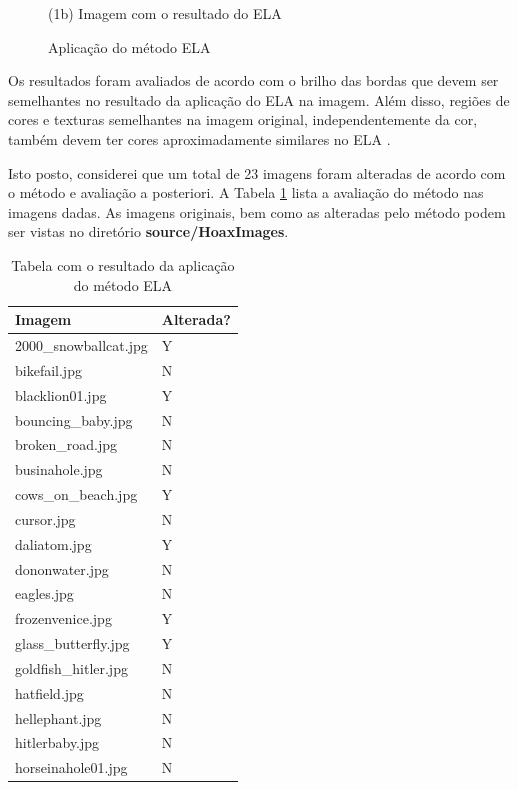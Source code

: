 \documentclass[12pt]{article}
\begin{document}
\begin{itemize}
\begin{itemize}
\begin{figure}[H]
\begin{minipage}[b]{0.45\textwidth}
	\centerline{\small (1b) Imagem com o resultado do ELA}
\end{minipage}
\caption{Aplicação do método ELA}
\label{fig1}
\end{figure}

Os resultados foram avaliados de acordo com o brilho das bordas que devem ser semelhantes no resultado 
da aplicação do ELA na imagem. Além disso, regiões de cores e texturas semelhantes na imagem
original, independentemente da cor, também devem ter cores aproximadamente similares no ELA \cite{berkeleywebsite}.

Isto posto, considerei que um total de 23 imagens foram alteradas de acordo com o método e avaliação a posteriori. 
A Tabela \ref{table-hoax-imgs} lista a avaliação do método nas imagens dadas. As imagens originais, bem como as
alteradas pelo método podem ser vistas no diretório \textbf{source/HoaxImages}.
\begin{table}[]
\centering
\caption{Tabela com o resultado da aplicação do método ELA}
\label{table-hoax-imgs}
\begin{tabular}{|l|l|} \hline
Imagem                 & Alterada? \\ \hline
2000\_snowballcat.jpg  & Y         \\
bikefail.jpg           & N         \\
blacklion01.jpg        & Y         \\
bouncing\_baby.jpg     & N         \\
broken\_road.jpg       & N         \\
businahole.jpg         & N         \\
cows\_on\_beach.jpg    & Y         \\
cursor.jpg             & N         \\
daliatom.jpg           & Y         \\
dononwater.jpg         & N         \\
eagles.jpg             & N         \\
frozenvenice.jpg       & Y         \\
glass\_butterfly.jpg   & Y         \\
goldfish\_hitler.jpg   & N         \\
hatfield.jpg           & N         \\
hellephant.jpg         & N         \\
hitlerbaby.jpg         & N         \\
horseinahole01.jpg     & N         \\

\end{tabular}
\end{table}
\end{itemize}
\end{itemize}
\end{document}

